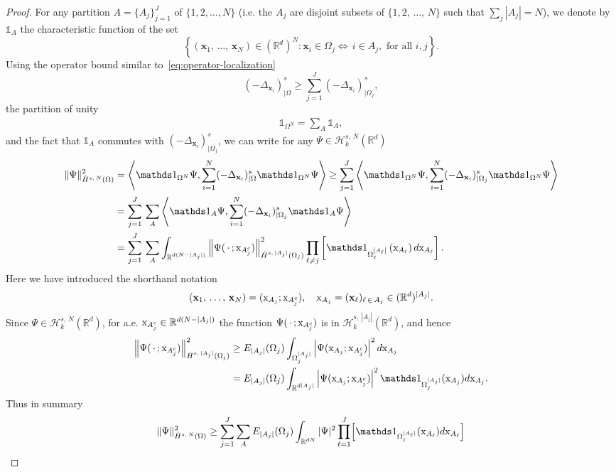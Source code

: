 \documentclass[10pt]{amsart}
\theoremstyle{definition}\newtheorem{defi}[theo]{Definition}\newtheorem{rema}[theo]{Remark}\newtheorem{exam}[theo]{Example}\newtheorem{exem}[theo]{Example}\newtheorem{nota}[theo]{Notation}
\newcommand*\R {\mathbb{R}}
\newcommand\1{{\ensuremath {\mathds 1} }}
\newcommand{\bx}{\mathbf{x}}
\newcommand{\cH}{\mathcal{H}}
\newcommand{\sx}{\textup{x}}
\begin{document}
\begin{proof}
For any partition $A=\{A_j\}_{j=1}^J$ of $\{1, 2, \ldots, N\}$ (i.e. the $A_j$ are disjoint subsets of $\{1, 2,\,\ldots,\,N\}$ such that $\sum_j |A_j|=N$), we denote by $\1_{A}$ the characteristic function of the set
\[
\left\{ (\bx_1,\,\dots,\,\bx_N) \in (\R^d)^N : \bx_i\in \Omega_j \Leftrightarrow\, i \in A_j, \text{ for all } i,j\right\}.
\]
Using the operator bound similar to~\eqref{eq:operator-localization}
\[
(-\Delta_{\bx_i})^s_{|\Omega} \ge \sum_{j=1}^J (-\Delta_{\bx_i})^s_{|\Omega_j},
\]
the partition of unity
\begin{align}\label{eq:pt-A}
\1_{\Omega^N} = \sum_{A} \1_{A},
\end{align}
and the fact that $\1_A$ commutes with $ (-\Delta_{\bx_i})^s_{|\Omega_j}$, we can write for any $\Psi\in \cH_{k}^{s,\,N}(\R^d)$
\begin{align*}
\|\Psi\|_{\dot{H}^{s,\,N}(\Omega)}^2 &= \left \langle \1_{\Omega^N}\Psi, \sum_{i=1}^N (-\Delta_{\bx_i})^s_{|\Omega} \1_{\Omega^N} \Psi \right\rangle 
\ge
\sum_{j=1}^J \left \langle \1_{\Omega^N} \Psi, \sum_{i=1}^N (-\Delta_{\bx_i})^s_{|\Omega_j} \1_{\Omega^N} \Psi\right\rangle \\
&=
\sum_{j=1}^J\,\sum_{A} \left \langle \1_A \Psi, \sum_{i=1}^N (-\Delta_{\bx_i})^s_{|\Omega_j} \1_A \Psi\right\rangle\\
&=
\sum_{j=1}^J\,\sum_{A} \int_{ \R^{d (N-|A_j|)}} \left\| \Psi(\,\cdot\,; \sx_{A_j^c}) \right\|^2_{\dot H^{s,\,|A_j|}(\Omega_j) } \prod_{\ell\ne j} \left[\1_{\Omega_\ell^{\left|A_\ell\right|}} \left(\sx_{A_\ell}\right) d \sx_{A_\ell}\right].
\end{align*}
Here we have introduced the shorthand notation
\[
(\bx_1,\,\ldots,\,\bx_N)=(\sx_{A_j};\sx_{A_j^c}), \quad \sx_{A_j}= (\bx_\ell)_{\ell\,\in\,A_j} \in (\R^{d})^{ |A_j|}.
\]
Since $\Psi\in \cH_{k}^{s,\,N}(\R^d)$, for a.e. $\sx_{A_j^c}\in \R^{d(N-|A_j|)}$ the function $\Psi(\,\cdot\,;\sx_{A_j^c})$ is in $\cH^{s,\,|A_j|}_{k}(\R^d)$, and hence
\begin{align*}
\left\| \Psi(\,\cdot\,; \sx_{A_j^c}) \right\|^2_{\dot H^{s,\,|A_j|}(\Omega_j) }&\ge
E_{|A_j|}(\Omega_j) \int_{\Omega_j^{|A_j|}} \left|\Psi(\sx_{A_j}; \sx_{A_j^c})\right|^2 d \sx_{A_j}\\
&= E_{|A_j|}(\Omega_j) \int_{\R^{d|A_j|}} \left|\Psi(\sx_{A_j}; \sx_{A_j^c})\right|^2 \1_{\Omega_j^{|A_j|}} (\sx_{A_j}) d \sx_{A_j}.
\end{align*}
Thus in summary
\begin{align*}
\|\Psi\|_{\dot{H}^{s,\,N}(\Omega)}^2 &\ge \sum_{j=1}^J \sum_{A} E_{|A_j|}(\Omega_j) \int_{ \R^{dN}} | \Psi |^2 \prod_{\ell=1}^J \Bigl[\1_{\Omega_\ell^{|A_\ell|}} (\sx_{A_\ell}) d \sx_{A_\ell} \Bigr] \\

\end{align*}
\end{proof}
\end{document}
